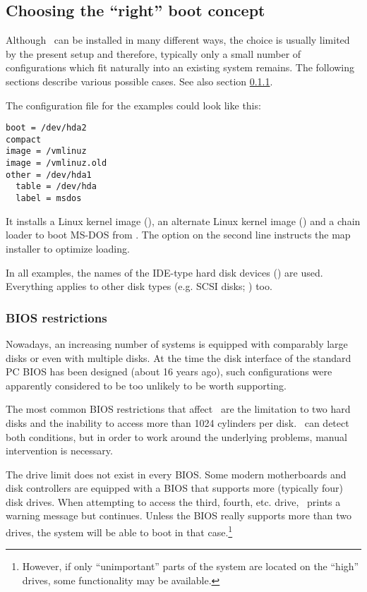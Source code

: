 \subsection{Choosing the ``right'' boot concept}

Although \LILO\ can be installed in many different ways, the choice is
usually limited by the present setup and therefore,
typically only a small number of configurations which fit naturally
into an existing system remains. The following sections describe various
possible cases. See also section \ref{broken}.

The configuration file  for the examples
could look like this:

\begin{verbatim}
boot = /dev/hda2
compact
image = /vmlinuz
image = /vmlinuz.old
other = /dev/hda1
  table = /dev/hda
  label = msdos
\end{verbatim}

It installs a Linux kernel image (),
an alternate Linux kernel image () and
a chain loader to boot MS-DOS from . The option 
on the second line instructs the map installer to optimize loading.

In all examples, the names of the IDE-type hard disk devices
() are used. Everything applies to other disk types
(e.g. SCSI disks; ) too.


\subsubsection{BIOS restrictions}
\label{broken}

Nowadays, an increasing number of systems is equipped with comparably large
disks or even with multiple disks. At the time the disk interface of the
standard PC BIOS has been designed (about 16 years ago), such configurations
were apparently considered to be too unlikely to be worth supporting.

The most common BIOS restrictions that affect \LILO\ are the limitation to
two hard disks and the inability to access more than 1024 cylinders per
disk. \LILO\ can detect both conditions, but in order to work around the
underlying problems, manual intervention is necessary.

The drive limit does not exist in every BIOS. Some modern motherboards
and disk controllers are equipped with a BIOS that supports more (typically
four) disk drives. When attempting to access the third, fourth, etc. drive,
\LILO\ prints a warning message but continues. Unless the BIOS really
supports more than two drives, the system will  be able to
boot in that case.\footnote{However, if only ``unimportant'' parts of the
system are located on the ``high'' drives, some functionality may be
available.}

